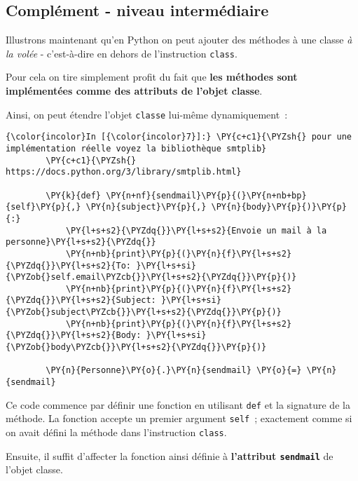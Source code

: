     \hypertarget{compluxe9ment---niveau-intermuxe9diaire}{%
\subsection{Complément - niveau
intermédiaire}\label{compluxe9ment---niveau-intermuxe9diaire}}

    Illustrons maintenant qu'en Python on peut ajouter des méthodes à une
classe \emph{à la volée} - c'est-à-dire en dehors de l'instruction
\texttt{class}.

Pour cela on tire simplement profit du fait que \textbf{les méthodes
sont implémentées comme des attributs de l'objet classe}.

    Ainsi, on peut étendre l'objet \texttt{classe} lui-même dynamiquement~:

    \begin{Verbatim}[commandchars=\\\{\},frame=single,framerule=0.3mm,rulecolor=\color{cellframecolor}]
{\color{incolor}In [{\color{incolor}7}]:} \PY{c+c1}{\PYZsh{} pour une implémentation réelle voyez la bibliothèque smtplib}
        \PY{c+c1}{\PYZsh{} https://docs.python.org/3/library/smtplib.html}
        
        \PY{k}{def} \PY{n+nf}{sendmail}\PY{p}{(}\PY{n+nb+bp}{self}\PY{p}{,} \PY{n}{subject}\PY{p}{,} \PY{n}{body}\PY{p}{)}\PY{p}{:}
            \PY{l+s+s2}{\PYZdq{}}\PY{l+s+s2}{Envoie un mail à la personne}\PY{l+s+s2}{\PYZdq{}}
            \PY{n+nb}{print}\PY{p}{(}\PY{n}{f}\PY{l+s+s2}{\PYZdq{}}\PY{l+s+s2}{To: }\PY{l+s+si}{\PYZob{}self.email\PYZcb{}}\PY{l+s+s2}{\PYZdq{}}\PY{p}{)}
            \PY{n+nb}{print}\PY{p}{(}\PY{n}{f}\PY{l+s+s2}{\PYZdq{}}\PY{l+s+s2}{Subject: }\PY{l+s+si}{\PYZob{}subject\PYZcb{}}\PY{l+s+s2}{\PYZdq{}}\PY{p}{)}
            \PY{n+nb}{print}\PY{p}{(}\PY{n}{f}\PY{l+s+s2}{\PYZdq{}}\PY{l+s+s2}{Body: }\PY{l+s+si}{\PYZob{}body\PYZcb{}}\PY{l+s+s2}{\PYZdq{}}\PY{p}{)}
            
        \PY{n}{Personne}\PY{o}{.}\PY{n}{sendmail} \PY{o}{=} \PY{n}{sendmail}
\end{Verbatim}


    Ce code commence par définir une fonction en utilisant \texttt{def} et
la signature de la méthode. La fonction accepte un premier argument
\texttt{self}~; exactement comme si on avait défini la méthode dans
l'instruction \texttt{class}.

Ensuite, il suffit d'affecter la fonction ainsi définie à
\textbf{l'attribut \texttt{sendmail}} de l'objet classe.

